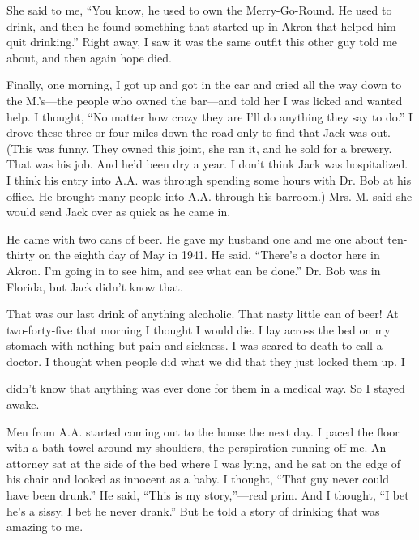She said to me, “You know, he used to own the Merry-Go-Round. He used to drink, and then he found something that started up in Akron that helped him quit drinking.” Right away, I saw it was the same outfit this other guy told me about, and then again hope died.

Finally, one morning, I got up and got in the car and cried all the way down to the M.’s—the people who owned the bar—and told her I was licked and wanted help. I thought, “No matter how crazy they are I’ll do anything they say to do.” I drove these three or four miles down the road only to find that Jack was out. (This was funny. They owned this joint, she ran it, and he sold for a brewery. That was his job. And he’d been dry a year. I don’t think Jack was hospitalized. I think his entry into A.A. was through spending some hours with Dr. Bob at his office. He brought many people into A.A. through his barroom.) Mrs. M. said she would send Jack over as quick as he came in.

He came with two cans of beer. He gave my husband one and me one about ten-thirty on the eighth day of May in 1941. He said, “There’s a doctor here in Akron. I’m going in to see him, and see what can be done.” Dr. Bob was in Florida, but Jack didn’t know that.

That was our last drink of anything alcoholic. That nasty little can of beer! At two-forty-five that morning I thought I would die. I lay across the bed on my stomach with nothing but pain and sickness. I was scared to death to call a doctor. I thought when people did what we did that they just locked them up. I

didn’t know that anything was ever done for them in a medical way. So I stayed awake.

Men from A.A. started coming out to the house the next day. I paced the floor with a bath towel around my shoulders, the perspiration running off me. An attorney sat at the side of the bed where I was lying, and he sat on the edge of his chair and looked as innocent as a baby. I thought, “That guy never could have been drunk.” He said, “This is my story,”—real prim. And I thought, “I bet he’s a sissy. I bet he never drank.” But he told a story of drinking that was amazing to me.

